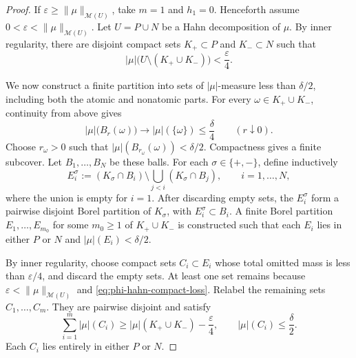 \documentclass[11pt]{amsart}
\theoremstyle{definition}
\theoremstyle{remark}
\begin{document}
\begin{proof}
If $\varepsilon\ge\|\mu\|_{\mathcal M(U)}$, take $m=1$ and $h_1=0$.
Henceforth assume $0<\varepsilon<\|\mu\|_{\mathcal M(U)}$.
Let $U=P\cup N$ be a Hahn decomposition of $\mu$. By inner
regularity, there are disjoint compact sets $K_+\subset P$ and $K_-\subset N$
such that
\begin{equation}
\label{eq:phi-hahn-compact-loss}
	|\mu|\bigl(U\setminus(K_+\cup K_-)\bigr)<\frac{\varepsilon}{4}.
\end{equation}

We now construct a finite partition into sets of $|\mu|$-measure less than
$\delta/2$, including both the atomic and nonatomic parts. For every $\omega\in K_+\cup K_-$, continuity from
above gives
\begin{equation*}
	|\mu|\bigl(B_r(\omega)\bigr)
	\longrightarrow |\mu|(\{\omega\})
	\le\frac{\delta}{4}
	\qquad(r\downarrow0).
\end{equation*}
Choose $r_\omega>0$ such that
$|\mu|(B_{r_\omega}(\omega))<\delta/2$. Compactness gives a finite subcover.
Let $B_1,\ldots,B_N$ be these balls. For each
$\sigma\in\{+,-\}$, define inductively
\begin{equation*}
E_i^\sigma
:=(K_\sigma\cap B_i)
\setminus\bigcup_{j<i}(K_\sigma\cap B_j),
\qquad i=1,\ldots,N,
\end{equation*}
where the union is empty for $i=1$. After discarding empty sets, the
$E_i^\sigma$ form a pairwise disjoint Borel partition of $K_\sigma$, with
$E_i^\sigma\subset B_i$.
A finite Borel partition $E_1,\ldots,E_{m_0}$ for some $m_0\ge1$ of
$K_+\cup K_-$ is constructed such that each
$E_i$ lies in either $P$ or $N$ and 
$|\mu|(E_i)<\delta/2$.

By inner regularity, choose compact sets $C_i\subset E_i$ whose total omitted
mass is less than $\varepsilon/4$, and discard the empty sets. 
At least one set remains because $\varepsilon<\|\mu\|_{\mathcal M(U)}$ and
\eqref{eq:phi-hahn-compact-loss}. 
Relabel the remaining sets $C_1,\ldots,C_m$. They are pairwise disjoint and satisfy
\begin{equation}
\label{eq:phi-core-loss}
	\sum_{i=1}^m|\mu|(C_i)
	\ge |\mu|(K_+\cup K_-)-\frac{\varepsilon}{4},
	\qquad
	|\mu|(C_i)\le\frac{\delta}{2}.
\end{equation}
Each $C_i$ lies entirely in either $P$ or $N$.


\end{proof}
\end{document}
